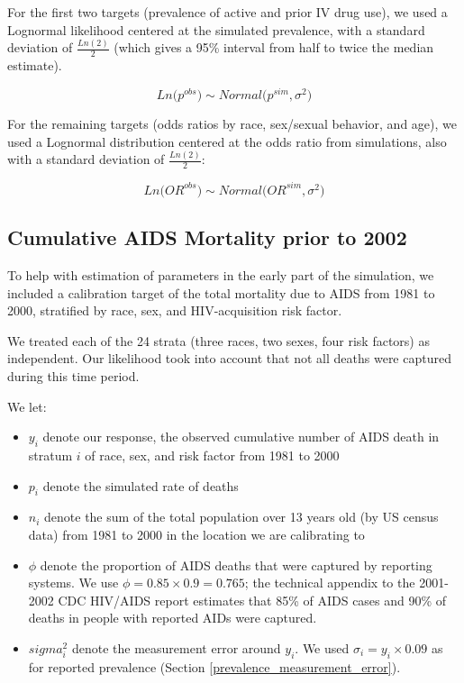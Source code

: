 \documentclass{article}
\begin{document}
For the first two targets (prevalence of active and prior IV drug use), we used a Lognormal likelihood centered at the simulated prevalence, with a standard deviation of $\frac{Ln(2)}{2}$ (which gives a 95\% interval from half to twice the median estimate).

\begin{equation}
	Ln\big(p^{obs}\big) \sim Normal\big(p^{sim}, \sigma^2\big)
\end{equation}

For the remaining targets (odds ratios by race, sex/sexual behavior, and age), we used a Lognormal distribution centered at the odds ratio from simulations, also with a standard deviation of $\frac{Ln(2)}{2}$:


\begin{equation}
Ln\big(OR^{obs}\big) \sim Normal\big(OR^{sim}, \sigma^2\big)
\end{equation}


\subsection{Cumulative AIDS Mortality prior to 2002}

To help with estimation of parameters in the early part of the simulation, we included a calibration target of the total mortality due to AIDS from 1981 to 2000, stratified by race, sex, and HIV-acquisition risk factor. 

We treated each of the 24 strata (three races, two sexes, four risk factors) as independent. Our likelihood took into account that not all deaths were captured during this time period.\cite{cdc14}

We let:
\begin{itemize}
	\item $y_i$ denote our response, the observed cumulative number of AIDS death in stratum $i$ of race, sex, and risk factor from 1981 to 2000
	\item $p_i$ denote the simulated rate of deaths
	\item $n_i$ denote the sum of the total population over 13 years old (by US census data) from 1981 to 2000 in the location we are calibrating to
	\item $\phi$ denote the proportion of AIDS deaths that were captured by reporting systems. We use $\phi = 0.85 \times 0.9 = 0.765$; the technical appendix to the 2001-2002 CDC HIV/AIDS report \cite{cdc14} estimates that 85\% of AIDS cases and 90\% of deaths in people with reported AIDs were captured.
	\item $sigma_i^2$ denote the measurement error around $y_i$. We used $\sigma_i = y_i \times 0.09$ as for reported prevalence (Section \ref{prevalence_measurement_error}).
\end{itemize}
\end{document}
